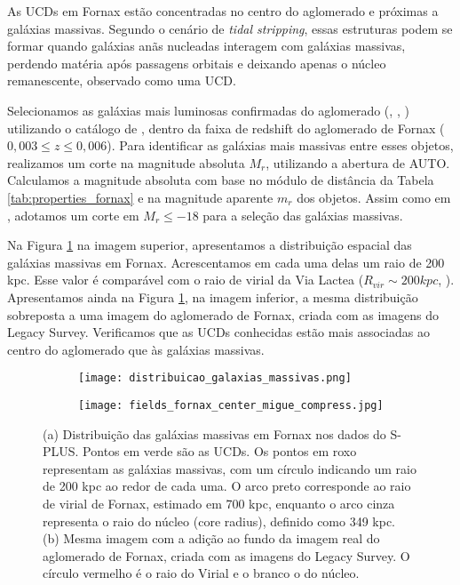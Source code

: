 As UCDs em Fornax estão concentradas no centro do aglomerado e próximas a galáxias massivas. Segundo o cenário de {\it tidal stripping}, essas estruturas podem se formar quando galáxias anãs nucleadas interagem com galáxias massivas, perdendo matéria após passagens orbitais e deixando apenas o núcleo remanescente, observado como uma UCD.

Selecionamos as galáxias mais luminosas confirmadas do aglomerado (\citealp{Ferguson_1989}, \citealp{Jordan_2007}, \citealp{Venhola_2018}) utilizando o catálogo de \cite{Lima_2024}, dentro da faixa de redshift do aglomerado de Fornax ($0,003\leq z\leq0,006$). Para identificar as galáxias mais massivas entre esses objetos, realizamos um corte na magnitude absoluta $M_r$, utilizando a abertura de AUTO. Calculamos a magnitude absoluta com base no módulo de distância da Tabela \ref{tab:properties_fornax} e na magnitude aparente $m_r$ dos objetos. Assim como em \cite{Saifollahi_2021}, adotamos um corte em $M_r \leq -18$ para a seleção das galáxias massivas.

Na Figura \ref{distribuicao_galaxias_massivas} na imagem superior, apresentamos a distribuição espacial das galáxias massivas em Fornax. Acrescentamos em cada uma delas um raio de 200 kpc. Esse valor é comparável com o raio de virial da Via Lactea ($R_{vir}\sim 200kpc$, \cite{Dehnen_2006}). Apresentamos ainda na Figura \ref{distribuicao_galaxias_massivas}, na imagem inferior, a mesma distribuição sobreposta a uma imagem do aglomerado de Fornax, criada com as imagens do Legacy Survey. Verificamos que as UCDs conhecidas estão mais associadas ao centro do aglomerado que às galáxias massivas.

\begin{figure}[!ht]
\centering
\captionsetup{justification=centering}
\begin{subfigure}[b]{0.75\textwidth}
    \texttt{[image: distribuicao\_galaxias\_massivas.png]}
    \caption{}
\end{subfigure}
\begin{subfigure}[b]{0.75\textwidth}
    \texttt{[image: fields\_fornax\_center\_migue\_compress.jpg]}
    \caption{}
\end{subfigure}
\caption{(a) Distribuição das galáxias massivas em Fornax nos dados do S-PLUS. Pontos em verde são as UCDs. Os pontos em roxo representam as galáxias massivas, com um círculo indicando um raio de 200 kpc ao redor de cada uma. O arco preto corresponde ao raio de virial de Fornax, estimado em 700 kpc, enquanto o arco cinza representa o raio do núcleo (core radius), definido como 349 kpc.\\ (b) Mesma imagem com a adição ao fundo da imagem real do aglomerado de Fornax, criada com as imagens do Legacy Survey. O círculo vermelho é o raio do Virial e o branco o do núcleo.}
\label{distribuicao_galaxias_massivas}
\end{figure}

